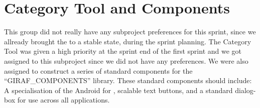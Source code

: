 \section{Category Tool and Components}

This group did not really have any subproject preferences for this sprint, since we allready brought the \launcher to a stable state, during the sprint planning. The \giraf Category Tool was given a high priority at the sprint end of the first sprint and we got assigned to this subproject since we did not have any preferences. We were also assigned to construct a series of standard components for the ``GIRAF\_COMPONENTS'' library. These standard components should include: A specialisation of the Android  for \giraf, scalable text buttons, and a standard dialog-box for use across all applications. 